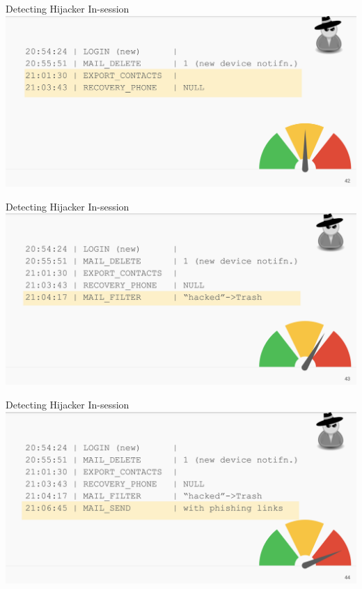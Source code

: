 \documentclass[nobackground,dvipsnames,table]{beamer}
\begin{document}
\begin{frame}{Detecting Hijacker In-session}
    \includegraphics[width=\textwidth]{detecting-hijackers-2}
\end{frame}

\begin{frame}{Detecting Hijacker In-session}
    \includegraphics[width=\textwidth]{detecting-hijackers-3}
\end{frame}

\begin{frame}{Detecting Hijacker In-session}
    \includegraphics[width=\textwidth]{detecting-hijackers-4}
\end{frame}
\end{document}
